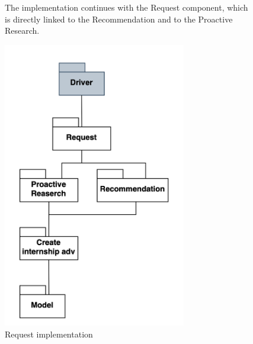\begin{figure}[H]
The implementation continues with the Request component, which is directly linked to the Recommendation and to the Proactive Research.
    \begin{center}
        \includegraphics[width=8cm]{images/IntegrationStrategy/req.png}
        \caption{Request implementation}
    \end{center}
\end{figure}

